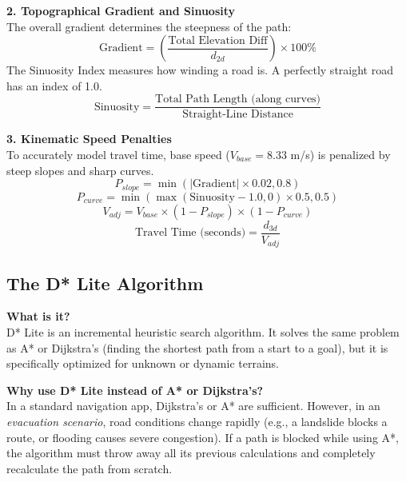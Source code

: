 \documentclass[12pt, a4paper]{article}
\begin{document}
\textbf{2. Topographical Gradient and Sinuosity} \\
The overall gradient determines the steepness of the path:
\begin{equation}
    \text{Gradient} = \left( \frac{\text{Total Elevation Diff}}{d_{2d}} \right) \times 100\%
\end{equation}
The Sinuosity Index measures how winding a road is. A perfectly straight road has an index of 1.0.
\begin{equation}
    \text{Sinuosity} = \frac{\text{Total Path Length (along curves)}}{\text{Straight-Line Distance}}
\end{equation}

\textbf{3. Kinematic Speed Penalties} \\
To accurately model travel time, base speed ($V_{base} = 8.33$ m/s) is penalized by steep slopes and sharp curves.
\begin{equation}
    P_{slope} = \min\left(|\text{Gradient}| \times 0.02, 0.8\right)
\end{equation}
\begin{equation}
    P_{curve} = \min\left(\max(\text{Sinuosity} - 1.0, 0) \times 0.5, 0.5\right)
\end{equation}
\begin{equation}
    V_{adj} = V_{base} \times (1 - P_{slope}) \times (1 - P_{curve})
\end{equation}
\begin{equation}
    \text{Travel Time (seconds)} = \frac{d_{3d}}{V_{adj}}
\end{equation}

\subsection{The D* Lite Algorithm}
\textbf{What is it?} \\
D* Lite is an incremental heuristic search algorithm. It solves the same problem as A* or Dijkstra's (finding the shortest path from a start to a goal), but it is specifically optimized for unknown or dynamic terrains.

\textbf{Why use D* Lite instead of A* or Dijkstra's?} \\
In a standard navigation app, Dijkstra's or A* are sufficient. However, in an \textit{evacuation scenario}, road conditions change rapidly (e.g., a landslide blocks a route, or flooding causes severe congestion). If a path is blocked while using A*, the algorithm must throw away all its previous calculations and completely recalculate the path from scratch. 
\end{document}
